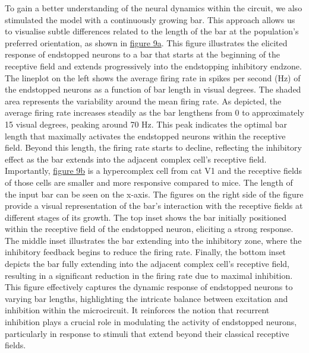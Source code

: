 \documentclass[12pt]{article}
\begin{document}
To gain a better understanding of the neural dynamics within the circuit, we also stimulated the model with a continuously growing bar. This approach allows us to visualise subtle differences related to the length of the bar at the population's preferred orientation, as shown in \hyperref[fig:endstopping_length]{figure 9a}. This figure illustrates the elicited response of endstopped neurons to a bar that starts at the beginning of the receptive field and extends progressively into the endstopping inhibitory endzone. The lineplot on the left shows the average firing rate in spikes per second (Hz) of the endstopped neurons as a function of bar length in visual degrees. The shaded area represents the variability around the mean firing rate. As depicted, the average firing rate increases steadily as the bar lengthens from 0 to approximately 15 visual degrees, peaking around 70 Hz. This peak indicates the optimal bar length that maximally activates the endstopped neurons within the receptive field. Beyond this length, the firing rate starts to decline, reflecting the inhibitory effect as the bar extends into the adjacent complex cell's receptive field. Importantly, \hyperref[fig:endstopping_length]{figure 9b} is a hypercomplex cell from cat V1 and the receptive fields of those cells are smaller and more responsive compared to mice. The length of the input bar can be seen on the x-axis. The figures on the right side of the figure provide a visual representation of the bar's interaction with the receptive fields at different stages of its growth. The top inset shows the bar initially positioned within the receptive field of the endstopped neuron, eliciting a strong response. The middle inset illustrates the bar extending into the inhibitory zone, where the inhibitory feedback begins to reduce the firing rate. Finally, the bottom inset depicts the bar fully extending into the adjacent complex cell's receptive field, resulting in a significant reduction in the firing rate due to maximal inhibition. This figure effectively captures the dynamic response of endstopped neurons to varying bar lengths, highlighting the intricate balance between excitation and inhibition within the microcircuit. It reinforces the notion that recurrent inhibition plays a crucial role in modulating the activity of endstopped neurons, particularly in response to stimuli that extend beyond their classical receptive fields.
\end{document}
